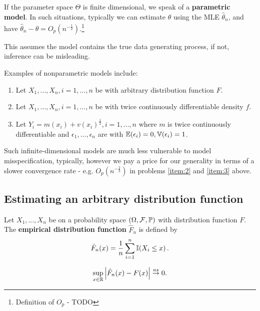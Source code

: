 If the parameter space $\Theta$ is finite dimensional, we speak of a
\textbf{parametric model}.  In such situations, typically we can
estimate $\theta$ using the MLE $\hat \theta_{n}$, and have $\hat
\theta_{n} - \theta = O_{p}(n^{-\frac{1}{2}})$.\footnote{Definition of
  $O_{p}$ - TODO}

This assumes the model contains the true data generating process, if
not, inference can be misleading.

Examples of nonparametric models include:
\begin{enumerate}
\item \label{item:1} Let $X_{1}, \dots, X_{n}, i = 1, \dots, n$ be
  \iid with arbitrary distribution function $F$.
\item \label{item:2} Let $X_{1}, \dots, X_{n}, i = 1, \dots, n$ be
  \iid with twice continuously differentiable density $f$.
\item \label{item:3} Let $Y_{i} = m(x_{i}) + v(x_{i})^{\frac{1}{2}}, i
  = 1, \dots, n$ where $m$ is twice continuously differentiable and
  $\epsilon_{1}, \dots, \epsilon_{n}$ are \iid with $\E{\epsilon_{i}}
  = 0, \Var{\epsilon_{i}} = 1$.
\end{enumerate}

Such infinite-dimensional models are much less vulnerable to model
misspecification, typically, however we pay a price for our generality
in terms of a slower convergence rate - e.g. $O_{p}(n^{-\frac{2}{3}})$
in problems \ref{item:2} and \ref{item:3} above.

\subsection{Estimating an arbitrary distribution function}
\label{sec:estim-an-arbitr}

Let $X_{1}, \dots, X_{n}$ be \iid on a probability space $(\Omega,
\mathcal{F}, \Prob)$ with distribution function $F$.  The
\textbf{empirical distribution function} $\hat F_{n}$ is defined by
\begin{equation}
  \label{eq:1}
  \hat F_{n}(x) = \frac{1}{n} \sum_{i=1}^{n} \I{X_{i} \leq x}.
\end{equation}


\begin{thm}
  \label{defn:Introduction:2}
  \begin{equation}
    \label{eq:2}
    \sup_{x \in \mathbb{R}} \left| \hat F_{n}(x) - F(x) \right| \overset{as}{\rightarrow} 0.
  \end{equation}
\end{thm}

